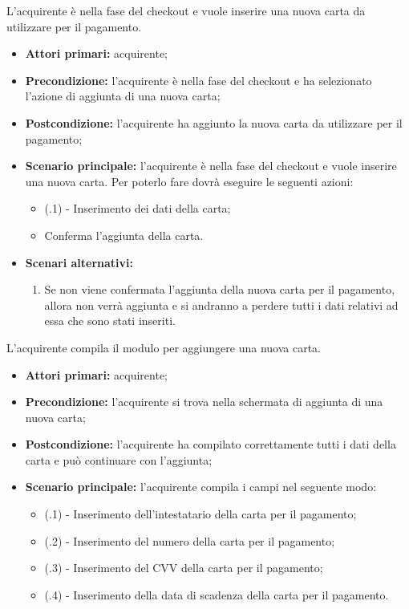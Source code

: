 
L'acquirente è nella fase del checkout e vuole inserire una nuova carta da utilizzare per il pagamento.
\begin{itemize}
    \item \textbf{Attori primari:} acquirente;
    \item \textbf{Precondizione:} l'acquirente è nella fase del checkout e ha selezionato l'azione di aggiunta di una nuova carta;
    \item \textbf{Postcondizione:} l'acquirente ha aggiunto la nuova carta da utilizzare per il pagamento;
    \item \textbf{Scenario principale:} l'acquirente è nella fase del checkout e vuole inserire una nuova carta. Per poterlo fare dovrà eseguire le seguenti azioni:
    \begin{itemize}
        \item (\actualUC.1) - Inserimento dei dati della carta;
        \item Conferma l'aggiunta della carta.
    \end{itemize}
    \item \textbf{Scenari alternativi:}
    \begin{enumerate}[label=\lett]
        \item Se non viene confermata l'aggiunta della nuova carta per il pagamento, allora non verrà aggiunta e si andranno a perdere tutti i dati relativi ad essa che sono stati inseriti.
    \end{enumerate}
\end{itemize}

\resetSubUC

L'acquirente compila il modulo per aggiungere una nuova carta.
\begin{itemize}
	\item \textbf{Attori primari:} acquirente;
	\item \textbf{Precondizione:} l'acquirente si trova nella schermata di aggiunta di una nuova carta;
	\item \textbf{Postcondizione:} l'acquirente ha compilato correttamente tutti i dati della carta e può continuare con l'aggiunta;
	\item \textbf{Scenario principale:} l'acquirente compila i campi nel seguente modo:
	\begin{itemize}
		\item (\actualSubUC.1) - Inserimento dell'intestatario della carta per il pagamento;
		\item (\actualSubUC.2) - Inserimento del numero della carta per il pagamento;
		\item (\actualSubUC.3) - Inserimento del CVV della carta per il pagamento;
		\item (\actualSubUC.4) - Inserimento della data di scadenza della carta per il pagamento.
	\end{itemize}
\end{itemize}

